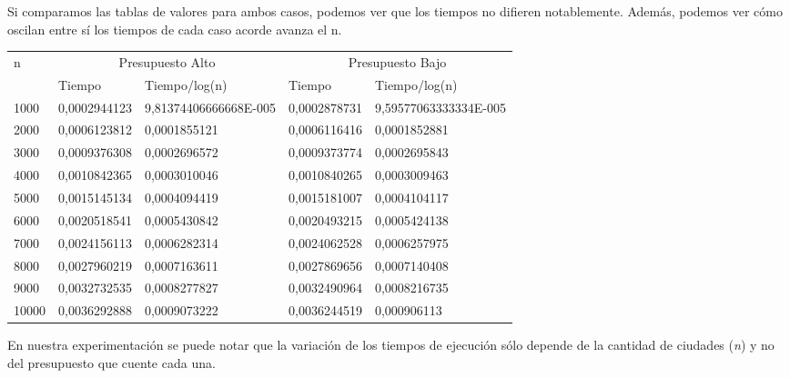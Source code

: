 Si comparamos las tablas de valores para ambos casos, podemos ver que los tiempos no difieren notablemente. Adem\'as, podemos ver c\'omo oscilan entre s\'i los tiempos de cada caso acorde avanza el n.\\

\begin{table}[htb]
\centering
\begin{tabular}[c]{|l|l|l|l|l|}



		\hline
		n &\multicolumn{2}{|c|}{Presupuesto Alto}& \multicolumn{2}{|c|}{Presupuesto Bajo}\\
		\cline{2-5}
		& Tiempo & Tiempo/log(n) & Tiempo & Tiempo/log(n)\\
		\hline
	1000 & 0,0002944123	& 9,81374406666668E-005 & 0,0002878731 & 9,59577063333334E-005 \\
	\hline
	2000 &	0,0006123812 &	0,0001855121 & 	0,0006116416 & 	0,0001852881 \\
	\hline	
	3000 & 0,0009376308	& 0,0002696572	& 	0,0009373774 & 	0,0002695843 \\
	\hline
	4000 & 0,0010842365 & 0,0003010046	& 	0,0010840265 & 	0,0003009463 \\
	\hline
	5000 & 	0,0015145134 & 0,0004094419	& 	0,0015181007 & 	0,0004104117 \\
	\hline
	6000 & 	0,0020518541 &	0,0005430842 & 	0,0020493215 & 	0,0005424138 \\
	\hline
	7000 & 0,0024156113	&	0,0006282314 & 	0,0024062528 & 	0,0006257975 \\
	\hline
	8000 & 0,0027960219	&	0,0007163611 & 	0,0027869656 & 	0,0007140408 \\
	\hline
	9000 & 0,0032732535	&	0,0008277827 & 	0,0032490964 & 	0,0008216735 \\
	\hline 
	10000 & 0,0036292888 &	0,0009073222 & 	0,0036244519 & 	0,000906113 \\
	\hline

		
	\end{tabular}
\end{table}

En nuestra experimentaci\'on se puede notar que la variaci\'on de los tiempos de ejecuci\'on s\'olo depende de la cantidad de ciudades (\emph{n}) y no del presupuesto que cuente cada una.



\newpage
 